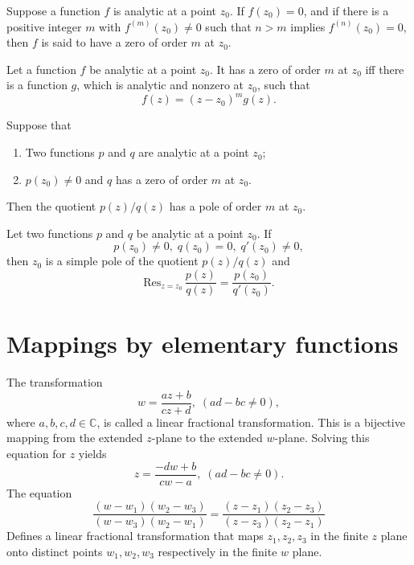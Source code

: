 \documentclass{article}
\begin{document}
\begin{definition}
	Suppose a function \(f\) is analytic at a point \(z_0\). If \(f(z_0)=0\), and if there is a positive integer \(m\) with \(f^{(m)}(z_0)\neq 0\) such that \(n>m\) implies \(f^{(n)}(z_0)=0\), then \(f\) is said to have a zero of order \(m\) at \(z_0\).
\end{definition}
\begin{theorem}
	Let a function \(f\) be analytic at a point \(z_0\). It has a zero of order \(m\) at \(z_0\) iff there is a function \(g\), which is analytic and nonzero at \(z_0\), such that
	\begin{equation*}
		f(z)=(z-z_0)^mg(z).
	\end{equation*}
\end{theorem}
\begin{theorem}
	Suppose that
	\begin{enumerate}
		\item Two functions \(p\) and \(q\) are analytic at a point \(z_0\);
		\item \(p(z_0)\neq 0\) and \(q\) has a zero of order \(m\) at \(z_0\).
	\end{enumerate}
	Then the quotient \(p(z)/q(z)\) has a pole of order \(m\) at \(z_0\).
\end{theorem}
\begin{theorem}
	Let two functions \(p\) and \(q\) be analytic at a point \(z_0\). If
	\begin{equation*}
		p(z_0)\neq 0,\;q(z_0)=0,\;q'(z_0)\neq 0,
	\end{equation*}
	then \(z_0\) is a simple pole of the quotient \(p(z)/q(z)\) and
	\begin{equation*}
		\text{Res}_{z=z_0}\,\frac{p(z)}{q(z)}=\frac{p(z_0)}{q'(z_0)}.
	\end{equation*}
\end{theorem}
\section{Mappings by elementary functions}
\begin{definition}
	The transformation
	\begin{equation*}
		w=\frac{az+b}{cz+d},\;(ad-bc\neq 0),
	\end{equation*}
	where \(a,b,c,d\in\mathbb{C}\), is called a linear fractional transformation. This is a bijective mapping from the extended \(z\)-plane to the extended \(w\)-plane. Solving this equation for \(z\) yields
	\begin{equation*}
		z=\frac{-dw+b}{cw-a},\;(ad-bc\neq 0).
	\end{equation*}
	The equation
	\begin{equation*}
		\frac{(w-w_1)(w_2-w_3)}{(w-w_3)(w_2-w_1)}=\frac{(z-z_1)(z_2-z_3)}{(z-z_3)(z_2-z_1)}
	\end{equation*}
	Defines a linear fractional transformation that maps \(z_1,z_2,z_3\) in the finite \(z\) plane onto distinct points \(w_1,w_2,w_3\) respectively in the finite \(w\) plane.
\end{definition}
\end{document}
